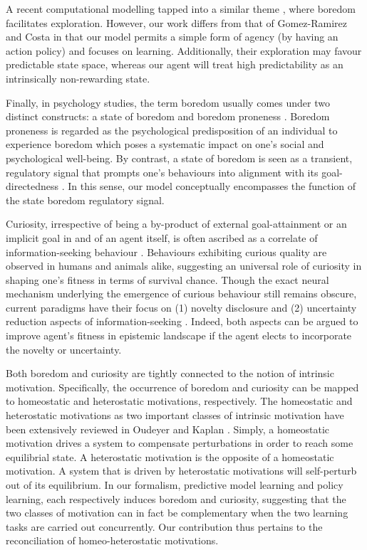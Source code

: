 \documentclass[utf8]{frontiersSCNS}
\begin{document}
\label{rev:creativity}
A recent computational modelling tapped into a similar theme \citep{Gomez-Ramirez2017}, where boredom facilitates exploration. However, our work differs from that of Gomez-Ramirez and Costa \citeyearpar{Gomez-Ramirez2017} in that our model permits a simple form of agency (by having an action policy) and focuses on learning. Additionally, their exploration may favour predictable state space, whereas our agent will treat high predictability as an intrinsically non-rewarding state.

Finally, in psychology studies, the term boredom usually comes under two distinct constructs: a state of boredom and boredom proneness \citep{Elpidorou2014, Elpidorou.2017, mugon2018failure}. Boredom proneness is regarded as the psychological predisposition of an individual to experience boredom which poses a systematic impact on one’s social and psychological well-being. By contrast, a state of boredom is seen as a transient, regulatory signal that prompts one’s behaviours into alignment with its goal-directedness \citep{Elpidorou.2017}. In this sense, our model conceptually encompasses the function of the state boredom regulatory signal. 

Curiosity, irrespective of being a by-product of external goal-attainment or an implicit goal in and of an agent itself, is often ascribed as a correlate of information-seeking behaviour \citep{2013gottlieb}. Behaviours exhibiting curious quality are observed in humans and animals alike, suggesting an universal role of curiosity in shaping one's fitness in terms of survival chance. Though the exact neural mechanism underlying the emergence of curious behaviour still remains obscure, current paradigms have their focus on (1) novelty disclosure and (2) uncertainty reduction aspects of information-seeking \citep{pathak2017icm, friston2017curiosity, bellemare2016count, ostrovski2017count}. Indeed, both aspects can be argued to improve agent's fitness in epistemic landscape if the agent elects to incorporate the novelty or uncertainty.

Both boredom and curiosity are tightly connected to the notion of intrinsic motivation. Specifically, the occurrence of boredom and curiosity can be mapped to homeostatic and heterostatic motivations, respectively. The homeostatic and heterostatic motivations as two important classes of intrinsic motivation have been extensively reviewed in Oudeyer and Kaplan \citeyearpar{intrinsicmotiv}. Simply, a homeostatic motivation drives a system to compensate perturbations in order to reach some equilibrial state. A heterostatic motivation is the opposite of a homeostatic motivation. A system that is driven by heterostatic motivations will self-perturb out of its equilibrium. In our formalism, predictive model learning and policy learning, each respectively induces boredom and curiosity, suggesting that the two classes of motivation can in fact be complementary when the two learning tasks are carried out concurrently. Our contribution thus pertains to the reconciliation of homeo-heterostatic motivations.
\end{document}
